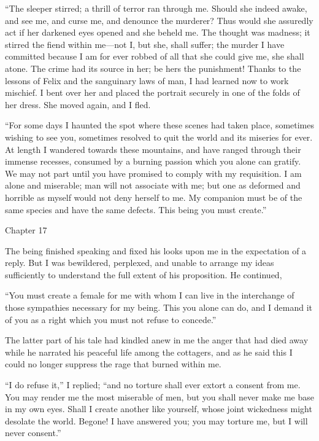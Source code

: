 \documentclass[12pt,openright]{book}
\begin{document}
“The sleeper stirred; a thrill of terror ran through me. Should she indeed awake, and see me, and curse me, and denounce the murderer? Thus would she assuredly act if her darkened eyes opened and she beheld me. The thought was madness; it stirred the fiend within me—not I, but she, shall suffer; the murder I have committed because I am for ever robbed of all that she could give me, she shall atone. The crime had its source in her; be hers the punishment! Thanks to the lessons of Felix and the sanguinary laws of man, I had learned now to work mischief. I bent over her and placed the portrait securely in one of the folds of her dress. She moved again, and I fled.

“For some days I haunted the spot where these scenes had taken place, sometimes wishing to see you, sometimes resolved to quit the world and its miseries for ever. At length I wandered towards these mountains, and have ranged through their immense recesses, consumed by a burning passion which you alone can gratify. We may not part until you have promised to comply with my requisition. I am alone and miserable; man will not associate with me; but one as deformed and horrible as myself would not deny herself to me. My companion must be of the same species and have the same defects. This being you must create.”

Chapter 17

The being finished speaking and fixed his looks upon me in the expectation of a reply. But I was bewildered, perplexed, and unable to arrange my ideas sufficiently to understand the full extent of his proposition. He continued,

“You must create a female for me with whom I can live in the interchange of those sympathies necessary for my being. This you alone can do, and I demand it of you as a right which you must not refuse to concede.”

The latter part of his tale had kindled anew in me the anger that had died away while he narrated his peaceful life among the cottagers, and as he said this I could no longer suppress the rage that burned within me.

“I do refuse it,” I replied; “and no torture shall ever extort a consent from me. You may render me the most miserable of men, but you shall never make me base in my own eyes. Shall I create another like yourself, whose joint wickedness might desolate the world. Begone! I have answered you; you may torture me, but I will never consent.”
\end{document}
